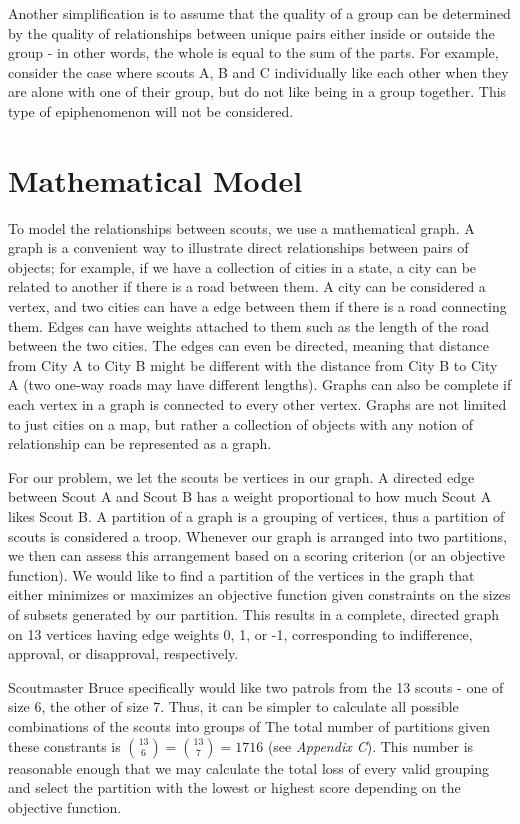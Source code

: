 \documentclass{amsart}
\theoremstyle{definition}
\theoremstyle{remark}
\numberwithin{equation}{section}
\begin{document}
Another simplification is to assume that the quality of a group can be determined by the quality of relationships between unique pairs either inside or outside the group - in other words, the whole is equal to the sum of the parts. For example, consider the case where scouts A, B and C individually like each other when they are alone with one of their group, but do not like being in a group together. This type of epiphenomenon will not be considered.

\section*{Mathematical Model}
To model the relationships between scouts, we use a mathematical graph. A graph is a convenient way to illustrate direct relationships between pairs of objects; for example, if we have a collection of cities in a state, a city can be related to another if there is a road between them. A city can be considered a vertex, and two cities can have a edge between them if there is a road connecting them. Edges can have weights attached to them such as the length of the road between the two cities. The edges can even be directed, meaning that distance from City A to City B might be different with the distance from City B to City A (two one-way roads may have different lengths). Graphs can also be complete if each vertex in a graph is connected to every other vertex. Graphs are not limited to just cities on a map, but rather a collection of objects with any notion of relationship can be represented as a graph.

For our problem, we let the scouts be vertices in our graph. A directed edge between Scout A and Scout B has a weight proportional to how much Scout A likes Scout B. A partition of a graph is a grouping of vertices, thus a partition of scouts is considered a troop. Whenever our graph is arranged into two partitions, we then can assess this arrangement based on a scoring criterion (or an objective function). We would like to find a partition of the vertices in the graph that either minimizes or maximizes an objective function given constraints on the sizes of subsets generated by our partition. This results in a complete, directed graph on 13 vertices having edge weights 0, 1, or -1, corresponding to indifference, approval, or disapproval, respectively. 

Scoutmaster Bruce specifically would like two patrols from the 13 scouts - one of size 6, the other of size 7. Thus, it can be simpler to calculate all possible combinations of the scouts into groups of 
The total number of partitions given these constrants is $\binom{13}{6} = \binom{13}{7} = 1716$ (see \textit{Appendix C}). This number is reasonable enough that we may calculate the total loss of every valid grouping and select the partition with the lowest or highest score depending on the objective function.
\end{document}
